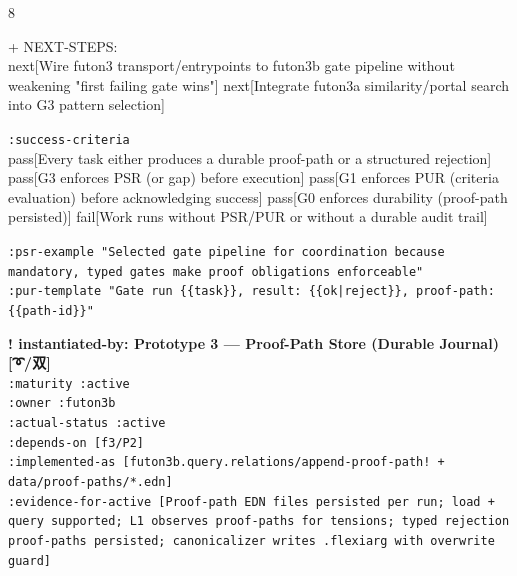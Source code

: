 \documentclass[landscape]{article}
\newenvironment{devmapactive}{%
  \def\FrameCommand{\colorbox{devmapactivebg}}%
  \setlength{\fboxsep}{2pt}%
  \MakeFramed{\advance\hsize-\width \FrameRestore}%
}{\endMakeFramed}
\begin{document}
\begin{paracol}{8}
\begin{devmapactive}
\par
  + NEXT-STEPS:\\
    next[Wire futon3 transport/entrypoints to futon3b gate pipeline without weakening "first failing gate wins"] next[Integrate futon3a similarity/portal search into G3 pattern selection]\\
\par
  \texttt{:\allowbreak{}success-\allowbreak{}criteria}\\
    pass[Every task either produces a durable proof-path or a structured rejection] pass[G3 enforces PSR (or gap) before execution] pass[G1 enforces PUR (criteria evaluation) before acknowledging success] pass[G0 enforces durability (proof-path persisted)] fail[Work runs without PSR/PUR or without a durable audit trail]\\
\par
  \texttt{:\allowbreak{}psr-\allowbreak{}example "Selected gate pipeline for coordination because mandatory,\allowbreak{} typed gates make proof obligations enforceable"}\\
  \texttt{:\allowbreak{}pur-\allowbreak{}template "Gate run \{\{task\}\},\allowbreak{} result:\allowbreak{} \{\{ok|\allowbreak{}reject\}\},\allowbreak{} proof-\allowbreak{}path:\allowbreak{} \{\{path-\allowbreak{}id\}\}"}\\
\par
\par
\end{devmapactive}
\begin{devmapactive}
\textbf{! instantiated-by: Prototype 3 — Proof-Path Store (Durable Journal) [➰/双]}\\
  \texttt{:\allowbreak{}maturity :\allowbreak{}active}\\
  \texttt{:\allowbreak{}owner :\allowbreak{}futon3b}\\
  \texttt{:\allowbreak{}actual-\allowbreak{}status :\allowbreak{}active}\\
  \texttt{:\allowbreak{}depends-\allowbreak{}on [f3/\allowbreak{}P2]}\\
  \texttt{:\allowbreak{}implemented-\allowbreak{}as [futon3b.query.relations/\allowbreak{}append-\allowbreak{}proof-\allowbreak{}path! +\allowbreak{} data/\allowbreak{}proof-\allowbreak{}paths/\allowbreak{}*.edn]}\\
  \texttt{:\allowbreak{}evidence-\allowbreak{}for-\allowbreak{}active [Proof-\allowbreak{}path EDN files persisted per run;\allowbreak{} load +\allowbreak{} query supported;\allowbreak{} L1 observes proof-\allowbreak{}paths for tensions;\allowbreak{} typed rejection proof-\allowbreak{}paths persisted;\allowbreak{} canonicalizer writes .flexiarg with overwrite guard]}\\

\end{devmapactive}
\end{paracol}
\end{document}
